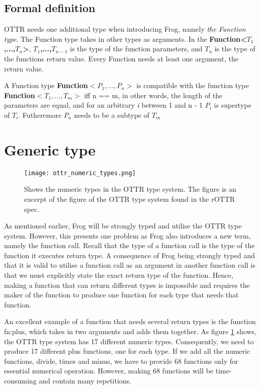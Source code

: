 \subsection{Formal definition}
OTTR needs one additional type when introducing Frog, namely \emph{the Function type}. The Function type takes in other types as arguments. In the \textbf{Function<$T_1$,...,$T_n$>},\textbf{ $T_1$,...,$T_{n - 1}$} is the type of the function parameters, and \textbf{$T_n$} is the type of the functions return value. Every Function needs at least one argument, the return value. 

\para
A Function type \textbf{Function$<P_1,...,P_n>$} is compatible with the function type \textbf{Function$<T_1,...,T_m>$} iff n == m, in other words, the length of the parameters are equal, and for an arbitrary \textit{i} between 1 and n - 1  \textbf{$P_i$} is supertype of \textbf{$T_i$}. Futheremore \textbf{$P_n$} needs to be a subtype of \textbf{$T_m$}

\section{Generic type}

\begin{figure}[b]
    \centering
    \texttt{[image: ottr\_numeric\_types.png]}
    \caption{Shows the numeric types in the OTTR type system. The figure is an excerpt of the figure of the OTTR type system found in the rOTTR spec\cite{OTTR_rOTTR}.}
    \label{fig:ottr_numeric_types}
\end{figure}

As mentioned earlier, Frog will be strongly typed and utilise the OTTR type system. However, this presents one problem as Frog also introduces a new term, namely the function call. Recall that the type of a function call is the type of the function it executes return type. A consequence of Frog being strongly typed and that it is valid to utilise a function call as an argument in another function call is that we must explicitly state the exact return type of the function. Hence, making a function that can return different types is impossible and requires the maker of the function to produce one function for each type that needs that function. 

\para
An excellent example of a function that needs several return types is the function fn:plus, which takes in two arguments and adds them together. As figure \ref{fig:ottr_numeric_types} shows, the OTTR type system has 17 different numeric types. Consequently, we need to produce 17 different plus functions, one for each type. If we add all the numeric functions, divide, times and minus, we have to provide 68 functions only for essential numerical operation. However, making 68 functions will be time-consuming and contain many repetitions. 


